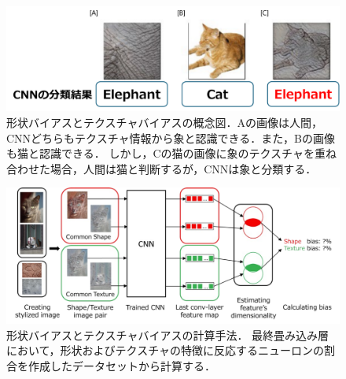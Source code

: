 \begin{figure}[h]
    \centering
    \includegraphics[width=\linewidth]{fig/shapetexturebias.pdf}
    \caption[形状バイアスとテクスチャバイアスの概念図]{形状バイアスとテクスチャバイアスの概念図．Aの画像は人間，CNNどちらもテクスチャ情報から象と認識できる．また，Bの画像も猫と認識できる．
    しかし，Cの猫の画像に象のテクスチャを重ね合わせた場合，人間は猫と判断するが，CNNは象と分類する．}
    \label{fig:ShapeTextureBias}
\end{figure}

\begin{figure}[h]
    \centering
    \includegraphics[width=\linewidth]{fig/IslamSTB.pdf}
    \caption[形状バイアスとテクスチャバイアスの計算手法]{形状バイアスとテクスチャバイアスの計算手法．
    最終畳み込み層において，形状およびテクスチャの特徴に反応するニューロンの割合を作成したデータセットから計算する．}
    \label{fig:IslamSTB}
\end{figure}

